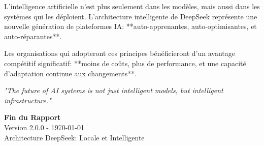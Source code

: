 \documentclass[12pt,a4paper]{article}
\begin{document}
L'intelligence artificielle n'est plus seulement dans les modèles, mais aussi dans les systèmes qui les déploient. L'architecture intelligente de DeepSeek représente une nouvelle génération de plateformes IA: **auto-apprenantes, auto-optimisantes, et auto-réparantes**.

Les organisations qui adopteront ces principes bénéficieront d'un avantage compétitif significatif: **moins de coûts, plus de performance, et une capacité d'adaptation continue aux changements**.

\vspace{0.5cm}

\textit{"The future of AI systems is not just intelligent models, but intelligent infrastructure."} 

\vspace{2cm}

\begin{flushright}
\textbf{Fin du Rapport} \\
Version 2.0.0 - \today \\
Architecture DeepSeek: Locale et Intelligente
\end{flushright}
\end{document}
